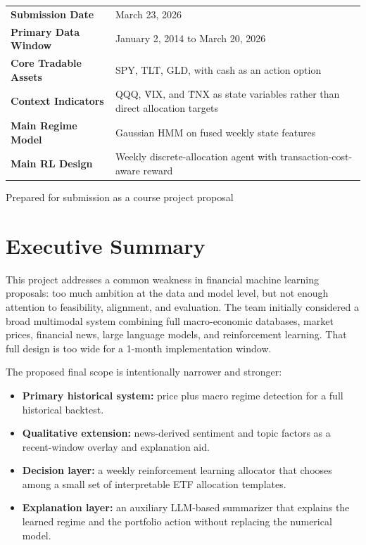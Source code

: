 \documentclass[11pt,a4paper]{article}
\begin{document}
\begin{titlepage}
\begin{tabularx}{\textwidth}{@{}P{0.22\textwidth}Y@{}}
\textbf{\color{navy}Submission Date} & March 23, 2026 \\
\textbf{\color{navy}Primary Data Window} & January 2, 2014 to March 20, 2026 \\
\textbf{\color{navy}Core Tradable Assets} & SPY, TLT, GLD, with cash as an action option \\
\textbf{\color{navy}Context Indicators} & QQQ, \^VIX, and \^TNX as state variables rather than direct allocation targets \\
\textbf{\color{navy}Main Regime Model} & Gaussian HMM on fused weekly state features \\
\textbf{\color{navy}Main RL Design} & Weekly discrete-allocation agent with transaction-cost-aware reward \\
\end{tabularx}

\vfill

{\color{white}\large\sffamily Prepared for submission as a course project proposal\par}
\end{titlepage}
\clearpage
{}
\hypersetup{pageanchor=true}

\tableofcontents
\newpage

\section{Executive Summary}

This project addresses a common weakness in financial machine learning proposals: too much ambition at the data and model level, but not enough attention to feasibility, alignment, and evaluation.
The team initially considered a broad multimodal system combining full macro-economic databases, market prices, financial news, large language models, and reinforcement learning.
That full design is too wide for a 1-month implementation window.

The proposed final scope is intentionally narrower and stronger:

\begin{itemize}[leftmargin=1.4em]
  \item \textbf{Primary historical system:} price plus macro regime detection for a full historical backtest.
  \item \textbf{Qualitative extension:} news-derived sentiment and topic factors as a recent-window overlay and explanation aid.
  \item \textbf{Decision layer:} a weekly reinforcement learning allocator that chooses among a small set of interpretable ETF allocation templates.
  \item \textbf{Explanation layer:} an auxiliary LLM-based summarizer that explains the learned regime and the portfolio action without replacing the numerical model.
\end{itemize}
\end{document}
